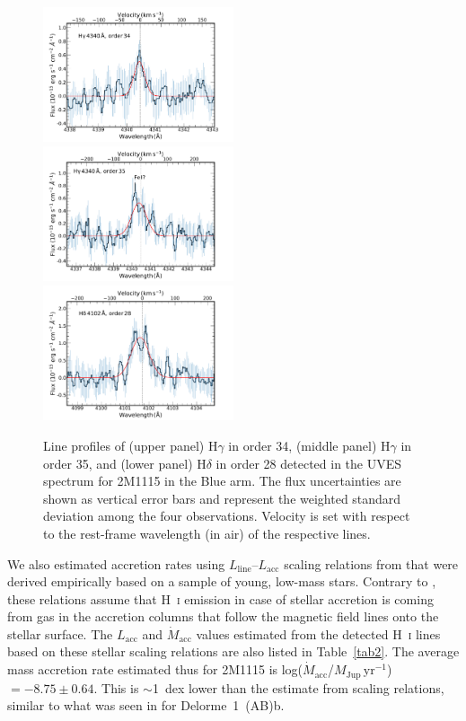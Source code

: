 \documentclass{aa}
\newcommand{\mjyr}{\ensuremath{M_\mathrm{Jup}\,\mathrm{yr^{-1}}}\xspace}
\newcommand{\Lacc}{\ensuremath{L_{\mathrm{acc}}}\xspace}
\newcommand{\mdot}{\ensuremath{\dot{M}_{\mathrm{acc}}}\xspace}
\newcommand{\Lline}{\ensuremath{L_{\mathrm{line}}}\xspace}
\newcommand{\Hi}{H~\textsc{i}\xspace}
\begin{document}
\begin{figure}[ht]
\centering
\includegraphics[width=0.5\textwidth]{Hgamma34.pdf} \\
\includegraphics[width=0.5\textwidth]{Hgamma35.pdf}\\
\includegraphics[width=0.5\textwidth]{H_delta.pdf}
\caption{Line profiles of (upper panel) H$\gamma$ in order 34, (middle panel) H$\gamma$ in order 35, and (lower panel) H$\delta$ in order 28 detected in the UVES spectrum for 2M1115 in the Blue arm. The flux uncertainties are shown as vertical error bars and represent the weighted standard deviation among the four observations. Velocity is set with respect to the rest-frame wavelength (in air) of the respective lines.}
\label{fig2}
\end{figure}

We also estimated accretion rates using \Lline--\Lacc scaling relations from \cite{alcala2017} that were derived empirically based on a sample of young, low-mass stars. Contrary to \cite{aoyama2021}, these relations assume that \Hi emission in case of stellar accretion is coming from gas in the accretion columns that follow the magnetic field lines onto the stellar surface. The \Lacc and \mdot values estimated from the detected \Hi lines based on these stellar scaling relations are also listed in Table~\ref{tab2}. The average mass accretion rate estimated thus for 2M1115 is log(\mdot/\mjyr) $=-8.75\pm0.64$. This is $\sim$1~dex lower than the estimate from \cite{aoyama2021} scaling relations, similar to what was seen in \cite{ringqvist2023} for Delorme~1~(AB)b.
\end{document}

